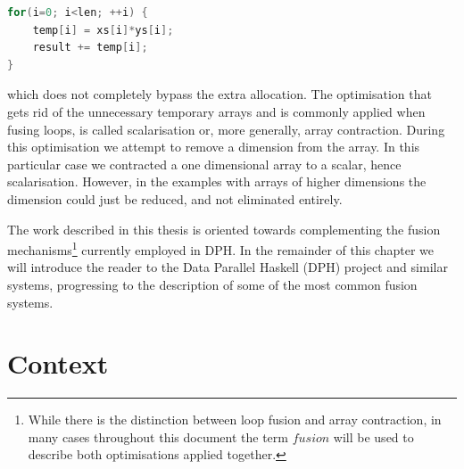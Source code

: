 \documentclass[preamble.tex]{subfiles}
\begin{document}
\begin{lstlisting}[basicstyle={\ttfamily},language=C,tabsize=4]
for(i=0; i<len; ++i) {
	temp[i] = xs[i]*ys[i];
	result += temp[i];
}
\end{lstlisting}


which does not completely bypass the extra allocation. The optimisation that gets rid of the unnecessary temporary arrays and is commonly applied when fusing loops, is called scalarisation or, more generally, array contraction. During this optimisation we attempt to remove a dimension from the array. In this particular case we contracted a one dimensional array to a scalar, hence scalarisation. However, in the examples with arrays of higher dimensions the dimension could just be reduced, and not eliminated entirely.

The work described in this thesis is oriented towards complementing the fusion mechanisms\footnote{While there is the distinction between loop fusion and array contraction, in many cases throughout this document the term $fusion$ will be used to describe both optimisations applied together.} currently employed in DPH. In the remainder of this chapter we will introduce the reader to the Data Parallel Haskell (DPH) project and similar systems, progressing to the description of some of the most common fusion systems.

\pagebreak{}


\chapter{\label{sec:Lit:DPH}Context}
\end{document}
